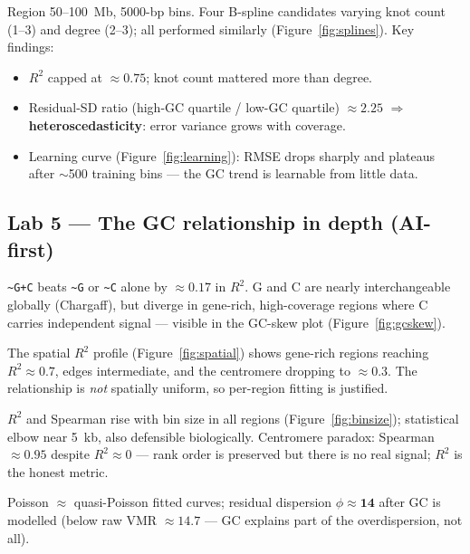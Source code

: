 \documentclass[11pt]{article}
\newcommand{\code}[1]{\texttt{#1}}
\begin{document}
Region 50--100~Mb, 5000-bp bins. Four B-spline candidates varying knot count (1--3)
and degree (2--3); all performed similarly (Figure~\ref{fig:splines}).
Key findings:
\begin{itemize}[leftmargin=*]
  \item $R^2$ capped at $\approx \mathbf{0.75}$; knot count mattered more than degree.
  \item Residual-SD ratio (high-GC quartile / low-GC quartile) $\approx \mathbf{2.25}$
    $\Rightarrow$ \textbf{heteroscedasticity}: error variance grows with coverage.
  \item Learning curve (Figure~\ref{fig:learning}): RMSE drops sharply and plateaus
    after $\sim$500 training bins --- the GC trend is learnable from little data.
\end{itemize}

\subsection{Lab 5 --- The GC relationship in depth (AI-first)}

\begin{description}[leftmargin=0pt]
  \item[(a) G vs.\ C vs.\ G+C:] \code{\textasciitilde G+C} beats \code{\textasciitilde G} or
    \code{\textasciitilde C} alone by $\approx \mathbf{0.17}$ in $R^2$. G and C are nearly
    interchangeable globally (Chargaff), but diverge in gene-rich, high-coverage
    regions where C carries independent signal --- visible in the GC-skew plot
    (Figure~\ref{fig:gcskew}).

  \item[(b) Spatial consistency:] The spatial $R^2$ profile (Figure~\ref{fig:spatial})
    shows gene-rich regions reaching $R^2\approx 0.7$, edges intermediate, and the
    centromere dropping to $\approx 0.3$. The relationship is \emph{not} spatially
    uniform, so per-region fitting is justified.

  \item[(c) Bin size:] $R^2$ and Spearman rise with bin size in all regions
    (Figure~\ref{fig:binsize}); statistical elbow near 5~kb, also defensible
    biologically. Centromere paradox: Spearman $\approx 0.95$ despite $R^2\approx 0$
    --- rank order is preserved but there is no real signal; $R^2$ is the honest metric.

  \item[(d) Poisson GLM:] Poisson $\approx$ quasi-Poisson fitted curves; residual
    dispersion $\phi \approx \mathbf{14}$ after GC is modelled (below raw VMR $\approx
    14.7$ --- GC explains part of the overdispersion, not all).
\end{description}
\end{document}

